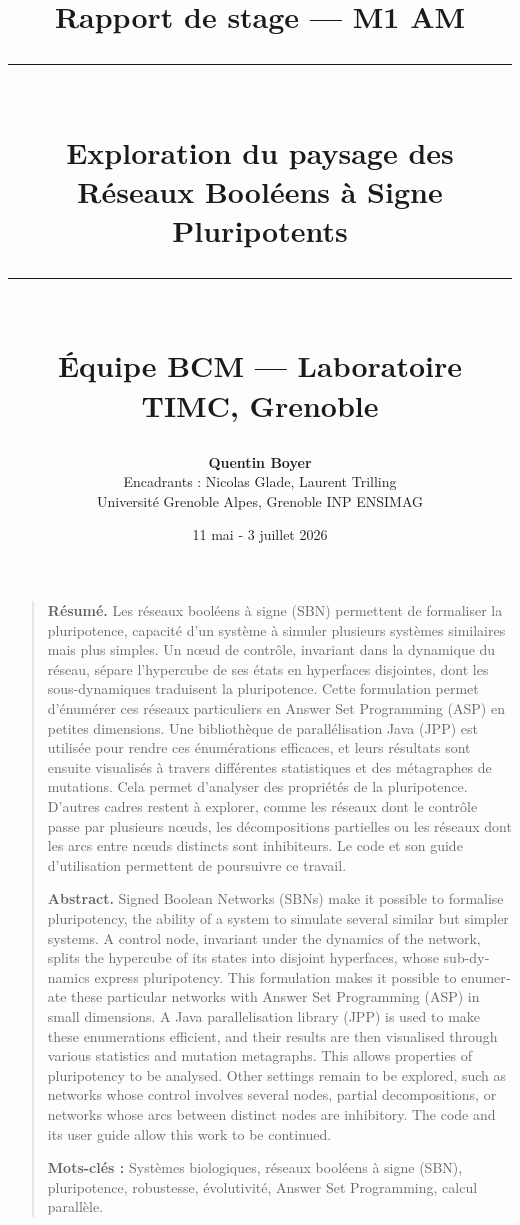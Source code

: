\documentclass[12pt, a4paper]{article}
\title{
    \vspace{2cm}
    {\Large Rapport de stage --- M1 AM}\\[0.5cm]
    \rule{\linewidth}{0.4pt}\\[0.4cm]
    {\LARGE \textbf{Exploration du paysage des\\
    Réseaux Booléens à Signe Pluripotents}}\\[0.4cm]
    \rule{\linewidth}{0.4pt}\\[1cm]
    {\large Équipe BCM --- Laboratoire TIMC, Grenoble}
}
\author{
    \textbf{Quentin Boyer}\\[0.3cm]
    \small Encadrants : Nicolas Glade, Laurent Trilling\\
    \small Université Grenoble Alpes, Grenoble INP ENSIMAG
}
\date{\small 11 mai - 3 juillet 2026}
\begin{document}

\maketitle
\thispagestyle{empty}
\newpage

\begin{quotation}\small %
\noindent
\textbf{Résumé.}
Les réseaux booléens à signe (SBN) permettent de formaliser la pluripotence, capacité d'un système à simuler plusieurs systèmes similaires mais plus simples.
Un nœud de contrôle, invariant dans la dynamique du réseau, sépare l'hypercube de ses états en hyperfaces disjointes, dont les sous-dynamiques traduisent la pluripotence.
Cette formulation permet d'énumérer ces réseaux particuliers en Answer Set Programming (ASP) en petites dimensions.
Une bibliothèque de parallélisation Java (JPP) est utilisée pour rendre ces énumérations efficaces, et leurs résultats sont ensuite visualisés à travers différentes statistiques et des métagraphes de mutations.
Cela permet d'analyser des propriétés de la pluripotence.
D'autres cadres restent à explorer, comme les réseaux dont le contrôle passe par plusieurs nœuds, les décompositions partielles ou les réseaux dont les arcs entre nœuds distincts sont inhibiteurs.
Le code et son guide d'utilisation permettent de poursuivre ce travail.

\bigskip
\noindent
\textbf{Abstract.}
\foreignlanguage{english}{%
Signed Boolean Networks (SBNs) make it possible to formalise pluripotency, the ability of a system to simulate several similar but simpler systems.
A control node, invariant under the dynamics of the network, splits the hypercube of its states into disjoint hyperfaces, whose sub-dynamics express pluripotency.
This formulation makes it possible to enumerate these particular networks with Answer Set Programming (ASP) in small dimensions.
A Java parallelisation library (JPP) is used to make these enumerations efficient, and their results are then visualised through various statistics and mutation metagraphs.
This allows properties of pluripotency to be analysed.
Other settings remain to be explored, such as networks whose control involves several nodes, partial decompositions, or networks whose arcs between distinct nodes are inhibitory.
The code and its user guide allow this work to be continued.}

\bigskip
\noindent
\textbf{Mots-clés :} Systèmes biologiques, réseaux booléens à signe (SBN), pluripotence, robustesse, évolutivité,
Answer Set Programming, calcul parallèle.
\end{quotation}
\end{document}
